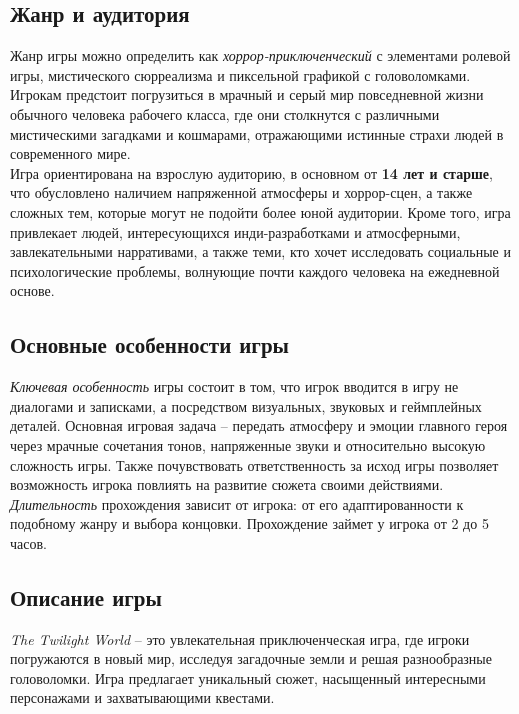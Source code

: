 \documentclass{article}
\begin{document}
	\subsection{Жанр и аудитория}    
	Жанр игры можно определить как \textit{хоррор-приключенческий} с элементами ролевой игры, мистического сюрреализма и пиксельной графикой с головоломками. Игрокам предстоит погрузиться в мрачный и серый мир повседневной жизни обычного человека рабочего класса, где они столкнутся с различными мистическими загадками и кошмарами, отражающими истинные страхи людей в современного мире. \\  
	
	Игра ориентирована на взрослую аудиторию, в основном от \textbf{14 
		лет и старше}, что обусловлено наличием напряженной атмосферы и хоррор-сцен, а также сложных тем, которые могут не подойти более юной аудитории. Кроме того, игра привлекает людей, интересующихся инди-разработками и атмосферными, завлекательными нарративами, а также теми, кто хочет исследовать социальные и психологические проблемы, волнующие почти каждого человека на ежедневной основе. \\

	\subsection{Основные особенности игры}
	
	\textit{Ключевая особенность} игры состоит в том, что игрок вводится в игру не диалогами и записками, а посредством визуальных, звуковых и геймплейных деталей. Основная игровая задача -- передать атмосферу и эмоции главного героя через мрачные сочетания тонов, напряженные звуки и относительно высокую сложность игры. Также почувствовать ответственность за исход игры позволяет возможность игрока повлиять на развитие сюжета своими действиями.\\
	
	\textit{Длительность} прохождения зависит от игрока: от его адаптированности к подобному жанру и выбора концовки. Прохождение займет у игрока от 2 до 5 часов.\\

	\subsection{Описание игры} 
	
	\textit{The Twilight World} -- это увлекательная приключенческая игра, где игроки погружаются в новый мир, исследуя загадочные земли и решая разнообразные головоломки. Игра предлагает уникальный сюжет, насыщенный интересными персонажами и захватывающими квестами.\\
	
\end{document}
